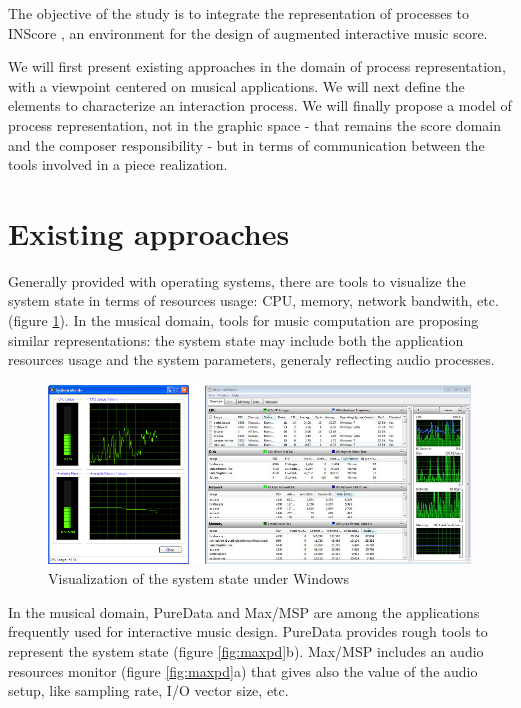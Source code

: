 \documentclass{article}
\begin{document}
The objective of the study is to integrate the representation of processes to INScore \cite{Fober:12a,Fober:13b}, an environment for the design of augmented interactive music score. 

We will first present existing approaches in the domain of process representation, with a viewpoint centered on musical applications. We will next define the elements to characterize an interaction process. We will finally propose a model of process representation, not in the graphic space - that remains the score domain and the composer responsibility - but in terms of communication between the tools involved in a piece realization.

\section{Existing approaches}
Generally provided with operating systems, there are tools to visualize the system state in terms of resources usage: CPU, memory, network bandwith, etc. (figure \ref{fig:sys}). 
In the musical domain, tools for music computation are proposing similar representations: the system state may include both the application resources usage and the system parameters, generaly reflecting audio processes.

\begin{figure}[h]
\begin{center}
	\includegraphics[width=0.9\columnwidth]{imgs/system}
\caption{Visualization of the system state under Windows}
\label{fig:sys}
\end{center}
\end{figure}

In the musical domain, PureData \cite{Puckette96puredata} and Max/MSP \cite{puckette91} are among the applications frequently used for interactive music design. PureData provides rough tools to represent the system state (figure \ref{fig:maxpd}b). Max/MSP includes an audio resources monitor (figure \ref{fig:maxpd}a) that gives also the value of the audio setup, like sampling rate, I/O vector size, etc.
\end{document}
